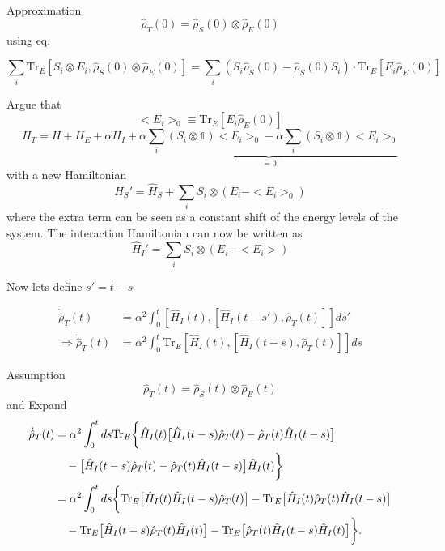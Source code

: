 Approximation
\begin{equation}
    \hat{\rho}_T(0) = \hat{\rho}_S(0) \otimes \hat{\rho}_E(0)
\end{equation}
using eq. 

\begin{equation}
    \sum_i \mathrm{Tr}_E[ S_i \otimes E_i , \hat{\rho}_S(0) \otimes \hat{\rho}_E(0)] =     \sum_i (S_i \hat{\rho}_S(0) - \hat{\rho}_S(0) S_i)\cdot  \mathrm{Tr}_E [E_i \hat{\rho}_E(0)]
\end{equation}

Argue that 
\begin{equation}
    < E_i >_0 \equiv \mathrm{Tr}_E [E_i \hat{\rho}_E(0)]
\end{equation}
\begin{equation}
    H_T = H + H_E + \alpha H_I + \underbrace{\alpha \sum_i ( S_i \otimes \mathbb{1} ) < E_i >_0 - \alpha \sum_i ( S_i \otimes \mathbb{1} ) < E_i >_0}_{= 0}
\end{equation}
with a new Hamiltonian
\begin{equation}
    \hat{H}_S' = \hat{H}_S + \sum_i S_i \otimes (E_i - < E_i >_0)
\end{equation}
where the extra term can be seen as a constant shift of the energy levels of the system. 
The interaction Hamiltonian can now be written as
\begin{equation}
    \hat{H}_I' = \sum_i S_i \otimes (E_i - < E_i >)
\end{equation}

Now lets define $s' = t - s$

\begin{align}
    \dot{\hat{\rho}}_T(t) &= \alpha^2 \int_0^t \left[ \hat{H}_I(t), \left[ \hat{H}_I(t-s'), \hat{\rho}_T(t) \right] \right] ds'\\
    \Rightarrow \dot{\hat{\rho}}_T(t) &= \alpha^2 \int_0^t \mathrm{Tr}_E \left[ \hat{H}_I(t), \left[ \hat{H}_I(t-s), \hat{\rho}_T(t) \right] \right] ds
\end{align}


Assumption
\begin{equation}
    \hat{\rho}_T(t) = \hat{\rho}_S(t) \otimes \hat{\rho}_E(t)
\end{equation}
and Expand
\begin{align}
    \dot{\hat{\rho}}_T(t) &= \alpha^2 \int_0^t ds \mathrm{Tr}_E \bigg\{ 
        \hat{H}_I(t) \big[ \hat{H}_I(t-s) \hat{\rho}_T(t)  - \hat{\rho}_T(t) \hat{H}_I(t-s) \big] \notag \\
        &\quad - \big[ \hat{H}_I(t-s) \hat{\rho}_T(t)  - \hat{\rho}_T(t) \hat{H}_I(t-s) \big] \hat{H}_I(t) 
    \bigg\} \notag \\
    &=  \alpha^2 \int_0^t ds \bigg\{ 
        \mathrm{Tr}_E \big[ \hat{H}_I(t) \hat{H}_I(t-s) \hat{\rho}_T(t) \big] - 
        \mathrm{Tr}_E \big[ \hat{H}_I(t) \hat{\rho}_T(t) \hat{H}_I(t-s) \big] \notag \\
        &\quad - \mathrm{Tr}_E \big[ \hat{H}_I(t-s) \hat{\rho}_T(t) \hat{H}_I(t) \big] - 
        \mathrm{Tr}_E \big[ \hat{\rho}_T(t) \hat{H}_I(t-s) \hat{H}_I(t) \big] 
    \bigg\}.
\end{align}